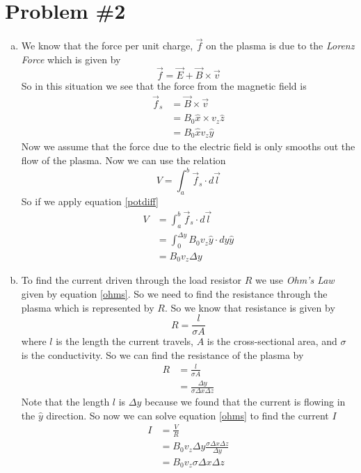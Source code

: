 \documentclass[11pt]{article}
\numberwithin{equation}{section}
\begin{document}
\section{Problem \#2}
\begin{enumerate}[(a)]
\item
We know that the force per unit charge, $\vec{f}$ on the plasma is due to the \emph{Lorenz Force} which is given by
\begin{equation}
\vec{f} = \vec{E}+\vec{B}\times\vec{v}
\label{lorenz}
\end{equation}
So in this situation we see that the force from the magnetic field is 
\begin{align*}
\vec{f}_s &= \vec{B}\times\vec{v}\\
&= B_0\hat{x}\times v_z\hat{z}\\
&= B_0\hat{x}v_z\hat{y}
\end{align*}
Now we assume that the force due to the electric field is only smooths out the flow of the plasma. Now we can use the relation 
\begin{equation}
V = \int_a^b\vec{f}_s\cdot d\vec{l}
\label{potdiff}
\end{equation}
So if we apply equation \ref{potdiff} 
\begin{align*}
V &= \int_a^b\vec{f}_s\cdot d\vec{l}\\
&= \int_0^{\Delta y}B_0v_z\hat{y}\cdot dy\hat{y}\\
&= B_0v_z\Delta y
\end{align*}

\item
To find the current driven through the load resistor $R$ we use \emph{Ohm's Law} given by equation \ref{ohms}. So we need to find the resistance through the plasma which is represented by $R$. So we know that resistance is given by
\begin{equation}
R = \frac{l}{\sigma A}
\label{equation}
\end{equation}
where $l$ is the length the current travels, $A$ is the cross-sectional area, and $\sigma$ is the conductivity. So we can find the resistance of the plasma by
\begin{align*}
R &= \frac{l}{\sigma A}\\
&= \frac{\Delta y}{\sigma \Delta x\Delta z}
\end{align*}
Note that the length $l$ is $\Delta y$ because we found that the current is flowing in the $\hat{y}$ direction. So now we can solve equation \ref{ohms} to find the current $I$
\begin{align*}
I &= \frac{V}{R}\\
&= B_0v_z\Delta y\frac{\sigma \Delta x\Delta z}{\Delta y}\\
&= B_0v_z\sigma \Delta x\Delta z
\end{align*}
\end{enumerate}
\end{document}
